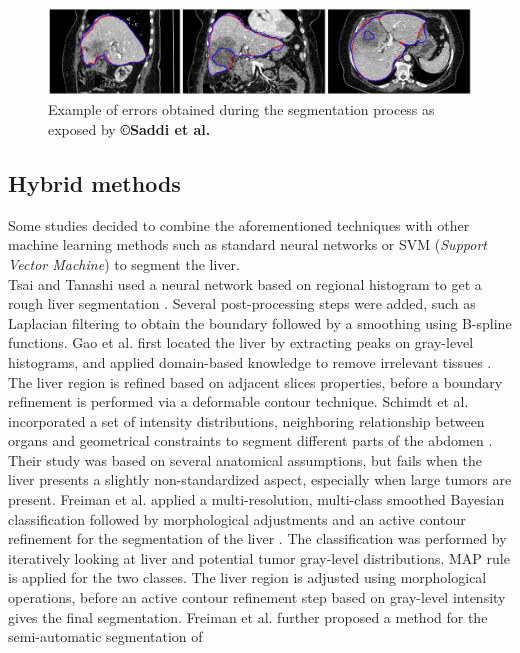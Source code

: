 \documentclass[]{article}
\begin{document}
	\begin{figure}[th!]
		\centering
		\includegraphics[width=0.7\linewidth]{images/image21}
		\caption{Example of errors obtained during the segmentation process as exposed by \textbf{©Saddi et al.} \cite{Saddi2007}}
		\label{Saddi2007_Fig}
	\end{figure}
	
	\subsection*{Hybrid methods}
	
	Some studies decided to combine the aforementioned techniques with other
	machine learning methods such as standard neural networks or SVM
	(\emph{Support Vector Machine}) to segment the liver.\\
	Tsai and Tanashi used a neural network based on regional histogram to get
	a rough liver segmentation \cite{Tsai1994}. Several post-processing steps were added,
	such as Laplacian filtering to obtain the boundary followed by a
	smoothing using B-spline functions.
	Gao et al. first located the liver by extracting peaks on gray-level
	histograms, and applied domain-based knowledge to remove irrelevant
	tissues \cite{Gao1996}. The liver region is refined based on adjacent slices
	properties, before a boundary refinement is performed via a deformable
	contour technique.
	Schimdt et al. incorporated a set of intensity distributions,
	neighboring relationship between organs and geometrical constraints to
	segment different parts of the abdomen \cite{Schmidt2007}. Their study was based on several
	anatomical assumptions, but fails when the liver presents a slightly
	non-standardized aspect, especially when large tumors are present.
	Freiman et al. applied a multi-resolution, multi-class smoothed Bayesian
	classification followed by morphological adjustments and an active
	contour refinement for the segmentation of the liver \cite{Freiman2008}. The classification
	was performed by iteratively looking at liver and potential tumor
	gray-level distributions. MAP rule is applied for the two classes. The
	liver region is adjusted using morphological operations, before an
	active contour refinement step based on gray-level intensity gives the
	final segmentation.
	Freiman et al. further proposed a method for the semi-automatic segmentation of
\end{document}
